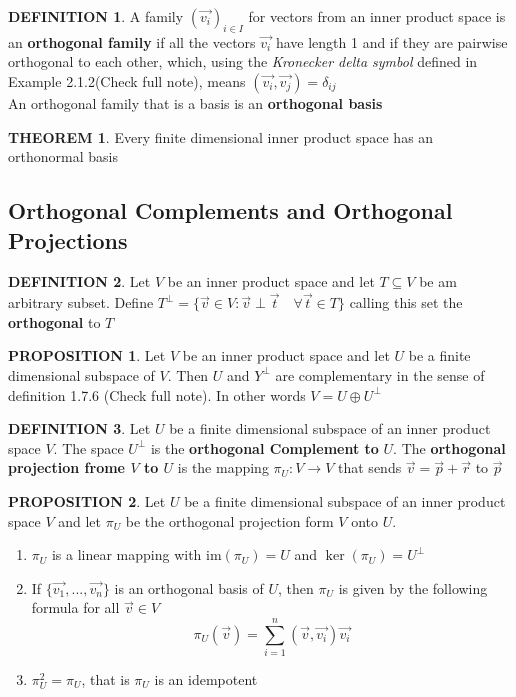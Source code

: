 \documentclass[10pt]{article}
\theoremstyle{definition}
\newtheorem{definition}{DEFINITION}[subsection]
\newtheorem{theorem}{THEOREM}[subsection]
\newcommand{\image}{\text{im}}
\newtheorem{prop}{PROPOSITION}[subsection]
\begin{document}
\begin{definition}
    A family $\left(\vec{v_i}\right)_{i\in I}$ for vectors from an inner product space is an \textbf{orthogonal family} if all the vectors $\vec{v_i}$ have length 1 and if they are pairwise orthogonal to each other, which, using the \textit{Kronecker delta symbol} defined in Example 2.1.2(Check full note), means $(\vec{v_i},\vec{v_j}) = \delta_{ij}$\\
    An orthogonal family that is a basis is an \textbf{orthogonal basis}
\end{definition}

\begin{theorem}
    Every finite dimensional inner product space has an orthonormal basis
\end{theorem}

\subsection{Orthogonal Complements and Orthogonal Projections}
\begin{definition}
    Let $V$ be an inner product space and let $T \subseteq V$ be am arbitrary subset. Define $T^\perp = \{\vec{v} \in V: \vec{v} \perp \vec{t} \quad\forall \vec{t} \in T\}$ calling this set the \textbf{orthogonal} to $T$
\end{definition}

\begin{prop}
    Let $V$ be an inner product space and let $U$ be a finite dimensional subspace of $V$. Then $U$ and $Y^\perp$ are complementary in the sense of definition 1.7.6 (Check full note). In other words $V = U \oplus U^\perp$
\end{prop}

\begin{definition}
    Let $U$ be a finite dimensional subspace of an inner product space $V$. The space $U^\perp$ is the \textbf{orthogonal Complement to} $U$. The \textbf{orthogonal projection frome $V$ to $U$} is the mapping $\pi_U:V \rightarrow V$ that sends $\vec{v} = \vec{p}+ \vec{r}$ to $\vec{p}$
\end{definition}

\begin{prop}
    Let $U$ be a finite dimensional subspace of an inner product space $V$ and let $\pi_U$ be the orthogonal projection form $V$ onto $U$.
    \begin{enumerate}
        \item $\pi_U$ is a linear mapping with $\image(\pi_U) = U$ and $\ker(\pi_U) = U^\perp$
        \item If $\{\vec{v_1},..., \vec{v_n}\}$ is an orthogonal basis of $U$, then $\pi_U$ is given by the following formula for all $\vec{v} \in V$ $$\pi_U(\vec{v}) = \sum_{i=1}^n(\vec{v},\vec{v_i})\vec{v_i}$$
        \item $\pi_U^2 = \pi_U$, that is $\pi_U$ is an idempotent
    \end{enumerate}
\end{prop}
\end{document}
